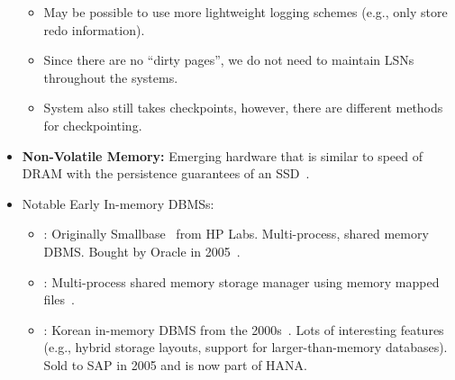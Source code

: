 \documentclass[11pt]{article}
\begin{document}
\begin{itemize}
\begin{itemize}
        \item
        May be possible to use more lightweight logging schemes (e.g., only store redo 
        information).
        
        \item
        Since there are no ``dirty pages'', we do not need to maintain LSNs throughout the systems.
        
        \item
        System also still takes checkpoints, however, there are different methods for 
        checkpointing.
    \end{itemize}
    
    \item
    \textbf{Non-Volatile Memory:}
    Emerging hardware that is similar to speed of DRAM with the 
    persistence guarantees of an SSD~\cite{arulraj15}.
    
    \item Notable Early In-memory DBMSs:
    \begin{itemize}
        \item
        : Originally Smallbase~\cite{heytens95} from HP Labs.
        Multi-process, shared memory DBMS.
        Bought by Oracle in 2005~\cite{lahiri13}.
        
        \item
        : Multi-process shared memory storage manager using memory mapped 
        files~\cite{Dali}.
        
        \item
        : Korean in-memory DBMS from the 2000s~\cite{cha04}. Lots of interesting 
        features (e.g., hybrid storage layouts, support for larger-than-memory databases). 
        Sold to SAP in 2005 and is now part of HANA.
    \end{itemize}
\end{itemize}

\newpage


\end{document}
